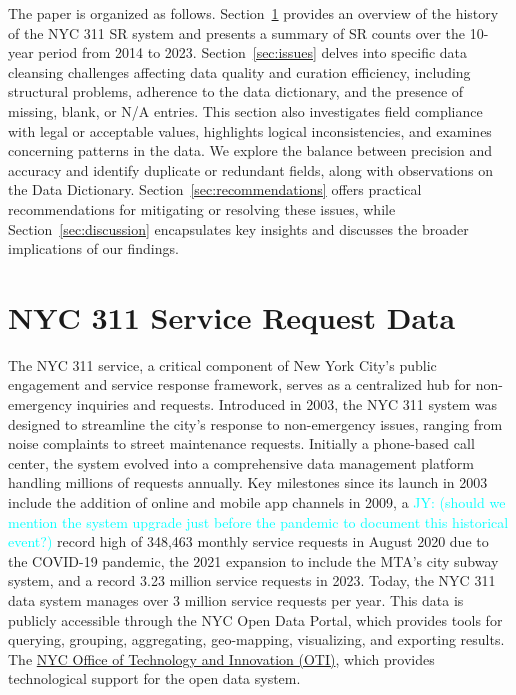 \documentclass[linenumber]{jdsart}
\newcommand{\jy}[1]{\textcolor{cyan}{JY: (#1)}}
\begin{document}
The paper is organized as follows. Section~\ref{sec:data} provides 
an overview of the history of the NYC 311 SR system and presents 
a summary of SR counts over the 10-year period from 2014 to 2023. 
Section~\ref{sec:issues} delves into specific data cleansing 
challenges affecting data quality and curation efficiency, 
including structural problems, adherence to the data dictionary, 
and the presence of missing, blank, or N/A entries. This section 
also investigates field compliance with legal or acceptable values, 
highlights logical inconsistencies, and examines concerning patterns 
in the data. We explore the balance between precision and accuracy 
and identify duplicate or redundant fields, along with observations 
on the Data Dictionary. Section~\ref{sec:recommendations} offers 
practical recommendations for mitigating or resolving these issues, 
while Section~\ref{sec:discussion} encapsulates key insights and 
discusses the broader implications of our findings.


\section{NYC 311 Service Request Data} 
\label{sec:data}
The NYC 311 service, a critical component of New York City's public
engagement and service response framework, serves as a centralized hub
for non-emergency inquiries and requests. Introduced in 2003, the NYC
311 system was designed to streamline the city's response to
non-emergency issues, ranging from noise complaints to street
maintenance requests. Initially a phone-based call center, the system
evolved into a comprehensive data management platform handling
millions of requests annually. Key milestones since its launch in 2003
include the addition of online and mobile app channels in 2009, a
\jy{should we mention the system upgrade just before the pandemic to
  document this historical event?}
record high of 348,463 monthly service requests in August 2020 due to
the COVID-19 pandemic, the 2021 expansion to include the MTA's city
subway system, and a record 3.23 million service requests in
2023. Today, the NYC 311 data system manages over 3 million service
requests per year. This data is publicly accessible through the NYC Open Data
Portal, which provides tools for querying, grouping, aggregating,
geo-mapping, visualizing, and exporting results. The
\href{https://www.nyc.gov/content/oti/pages/}{NYC Office of Technology
  and Innovation (OTI)}, which provides technological support for the
open data system. 
\end{document}
